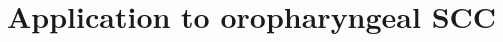 \documentclass[\relativeRoot/main.tex]{subfiles}
\begin{document}
\section{Application to oropharyngeal SCC}
    

\end{document}
